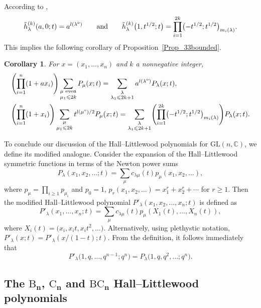 \documentclass[pdftex]{sigma}
\numberwithin{equation}{section}
\newtheorem{Corollary}[Theorem]{Corollary}
\renewcommand{\leq}{\leqslant}
\renewcommand{\geq}{\geqslant}
\newcommand{\odd}{\textup{o}}
\newcommand{\la}{\lambda}
\begin{document}
According to \cite[equation~(2.3.7)]{RW21},
\[
\tilde{h}_{\la}^{(k)}(a,0;t)=a^{l(\la^{\odd})}
\qquad\text{and}\qquad
\tilde{h}_{\la}^{(k)}\bigl(1,t^{1/2};t\bigr)
=\prod_{i=1}^{2k} \bigl(-t^{1/2};t^{1/2}\bigr)_{m_i(\la)}.
\]
This implies the following corollary of Proposition~\ref{Prop_33bounded}.

\begin{Corollary}
For $x=(x_1,\dots,x_n)$ and $k$ a nonnegative integer,
\begin{subequations}
\begin{align}\label{Eq_oddk1}
&\Biggl(\prod_{i=1}^n (1+ax_i)\Biggr)
\sum_{\substack{\mu \text{ even} \\[1pt] \mu_1\leq 2k}}
P_{\mu}(x;t)=\sum_{\substack{\la \\[1pt] \la_1\leq 2k+1}}
a^{l(\la^{\odd})} P_{\la}(x;t), \\
&\Biggl(\prod_{i=1}^n (1+x_i)\Biggr)
\sum_{\substack{\mu \\[1pt] \mu_1\leq 2k}} t^{l(\mu^{\odd})/2}P_{\mu}(x;t)
=\sum_{\substack{\la \\[1pt] \la_1\leq 2k+1}}
\Biggl(\prod_{i=1}^{2k}\bigl(-t^{1/2};t^{1/2}\bigr)_{m_i(\la)}\Biggr)
P_{\la}(x;t).
\label{Eq_oddk2}
\end{align}
\end{subequations}
\end{Corollary}

To conclude our discussion of the Hall--Littlewood polynomials
for $\mathrm{GL}(n,\mathbb{C})$, we define its modified analogue.
Consider the expansion of the Hall--Littlewood symmetric functions
in terms of the Newton power sums
\[
P_{\la}(x_1,x_2,\dots;t)=\sum_{\mu} c_{\la\mu}(t) p_{\mu}(x_1,x_2,\dots),
\]
where $p_{\mu}=\prod_{i\geq 1} p_{\mu_i}$ and
$p_0=1$, $p_r(x_1,x_2,\dots)=x_1^r+x_2^r+\cdots$ for $r\geq 1$.
Then the modified Hall--Littlewood polynomial
$P'_{\la}(x_1,x_2,\dots,x_n;t)$ is defined as
\[
P'_{\la}(x_1,\dots,x_n;t)=\sum_{\mu} c_{\la\mu}(t)
p_{\mu} (X_1(t),\dots,X_n(t) ),
\]
where $X_i(t)=\bigl(x_i,x_it,x_it^2,\dots\bigr)$.
Alternatively, using plethystic notation,
$P'_{\la}(x;t)=P'_{\la}(x/(1-t);t)$.
From the definition, it follows immediately that
\begin{equation}\label{Eq_PPp-spec}
P'_{\la}\bigl(1,q,\dots,q^{n-1};q^n\bigr)=
P_{\la}\bigl(1,q,q^2,\dots;q^n\bigr).
\end{equation}

\subsection[The B\_n, C\_n and BC\_n]{The $\boldsymbol{\mathrm{B}_n}$, $\boldsymbol{\mathrm{C}_n}$ and $\boldsymbol{\mathrm{BC}_n}$
Hall--Littlewood polynomials}\label{Sec_HL-BCn}
\end{document}
